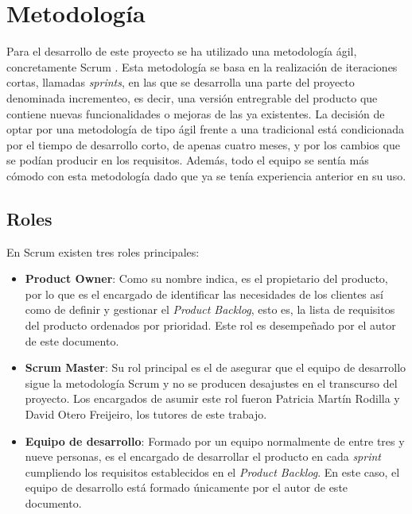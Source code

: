 \chapter{Metodología}
\label{chap:metodologia}

Para el desarrollo de este proyecto se ha utilizado una metodología ágil, concretamente Scrum \cite{scrum}.
Esta metodología se basa en la realización de iteraciones cortas, llamadas \textit{sprints}, en las que se desarrolla una parte del proyecto
denominada incrementeo, es decir, una versión entregrable del producto que contiene
nuevas funcionalidades o mejoras de las ya existentes. La decisión de optar por una metodología de tipo ágil frente a una tradicional
está condicionada por el tiempo de desarrollo corto, de apenas cuatro meses, y por los cambios que se podían producir en los requisitos.
Además, todo el equipo se sentía más cómodo con esta metodología dado que ya se tenía experiencia anterior en su uso.

\section{Roles}
\label{sec:metodologia_roles}

En Scrum existen tres roles principales:

\begin{itemize}
		\item \textbf{Product Owner}: Como su nombre indica, es el propietario del producto, por lo que es el encargado de identificar
		las necesidades de los clientes así como de definir y gestionar el \textit{Product Backlog}, esto es, la lista de requisitos del producto ordenados por prioridad.
		Este rol es desempeñado por el autor de este documento.
		\item \textbf{Scrum Master}: Su rol principal es el de asegurar que el equipo de desarrollo sigue la metodología Scrum y no se producen
		desajustes en el transcurso del proyecto. Los encargados de asumir este rol fueron Patricia Martín Rodilla y David Otero Freijeiro, los
		tutores de este trabajo.
		\item \textbf{Equipo de desarrollo}: Formado por un equipo normalmente de entre tres y nueve personas, es el encargado de desarrollar el producto
		en cada \textit{sprint} cumpliendo los requisitos establecidos en el \textit{Product Backlog}. En este caso, el equipo de desarrollo está
		formado únicamente por el autor de este documento.
\end{itemize}

